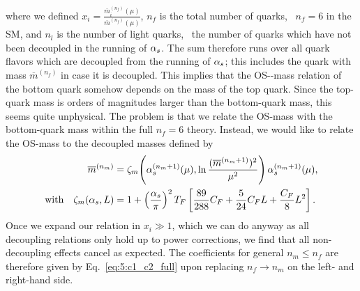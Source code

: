 where we defined $ x_i = \frac{\overline{m}^{(n_f)}_i(\mu)}{\overline{m}^{(n_f)}(\mu)}$, $n_f$ is the total number of quarks, \ie\ $n_f = 6$ in the \acs{SM}, and $n_l$ is the number of light quarks, \ie\ the number of quarks which have not been decoupled in the running of $\alpha_s$. The sum therefore runs over all quark flavors which are decoupled from the running of $\alpha_s$; this includes the quark with mass $\overline{m}^{(n_f)}$ in case it is decoupled. This implies that the \acs{OS}-\MS-mass relation of the bottom quark somehow depends on the mass of the top quark. Since the top-quark mass is orders of magnitudes larger than the bottom-quark mass, this seems quite unphysical. The problem is that we relate the \acs{OS}-mass with the bottom-quark mass within the full $n_f = 6$ theory. Instead, we would like to relate the \acs{OS}-mass to the decoupled masses defined by
\begin{equation}
\begin{split}
\overline{m}^{(n_m)} &= \zeta_m\!\left(\alpha_s^{(n_m + 1)}(\mu) , \ln \frac{(\overline{m}^{(n_m + 1)})^2}{\mu^2} \right) \alpha_s^{(n_m + 1)}(\mu), \\
\text{with} \quad \zeta_m (\alpha_s, L) &=  1 + \left(\frac{\alpha_s}{\pi}\right)^2 T_F \left[ \frac{89}{288} C_F  + \frac{5}{24} C_F L + \frac{C_F}{8} L^2 \right].
\end{split}
\end{equation}
Once we expand our relation in $x_i \gg 1$, which we can do anyway as all decoupling relations only hold up to power corrections, we find that all non-decoupling effects cancel as expected. The coefficients for general $n_m \le n_f$ are therefore given by Eq.~\eqref{eq:5:c1_c2_full} upon replacing $n_f \rightarrow n_m$ on the left- and right-hand side.

